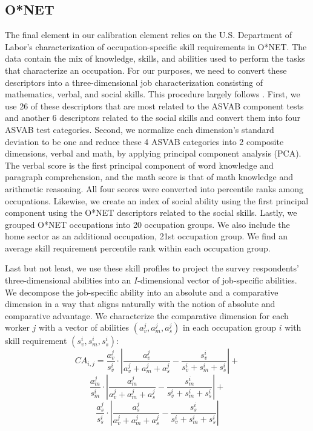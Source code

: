 \documentclass[onehalfspacing,11pt]{article}
\begin{document}
	\subsection{O*NET}
	The final element in our calibration element relies on the U.S. Department of Labor’s characterization of occupation-specific skill requirements in O*NET. The data contain the mix of knowledge, skills, and abilities used to perform the tasks that characterize an occupation. For our purposes, we need to convert these descriptors into a three-dimensional job characterization consisting of mathematics, verbal, and social skills. This procedure largely follows \cite{Guvenen:2020}. First, we use 26 of these descriptors that are most related to the ASVAB component tests and another 6 descriptors related to the social skills and convert them into four ASVAB test categories. Second, we normalize each dimension’s standard deviation to be one and reduce these 4 ASVAB categories into 2 composite dimensions, verbal and math, by applying principal component analysis (PCA). The verbal score is the first principal component of word knowledge and paragraph comprehension, and the math score is that of math knowledge and arithmetic reasoning. All four scores were converted into percentile ranks among occupations. Likewise, we create an index of social ability using the first principal component using the O*NET descriptors related to the social skills. Lastly, we grouped O*NET occupations into 20 occupation groups. We also include the home sector as an additional occupation, 21st occupation group. We find an average skill requirement percentile rank within each occupation group. 
	
	Last but not least, we use these skill profiles to project the survey respondents' three-dimensional abilities into an $I$-dimensional vector of job-specific abilities. We decompose the job-specific ability into an absolute and a comparative dimension in a way that aligns naturally with the notion of absolute and comparative advantage. We characterize the comparative dimension for each worker $j$ with a vector of abilities $(a^j_v, a^j_m, a^j_s)$ in each occupation group $i$ with skill requirement $(s^i_v, s^i_m, s^i_s)$:
	\[CA_{i,j}=\frac{a^j_v}{s^i_v} \cdot \left|\frac{a^j_v}{a^j_v+a^j_m+a^j_s}-\frac{s^i_v}{s^i_v+s^i_m+s^i_s}\right|+\]
	\[\frac{a^j_m}{s^i_m} \cdot \left|\frac{a^j_m}{a^j_v+a^j_m+a^j_s}-\frac{s^i_m}{s^i_v+s^i_m+s^i_s}\right|+\]
	\[\frac{a^j_s}{s^i_s} \cdot \left|\frac{a^j_s}{a^j_v+a^j_m+a^j_s}-\frac{s^i_s}{s^i_v+s^i_m+s^i_s}\right|\]
	
\end{document}
